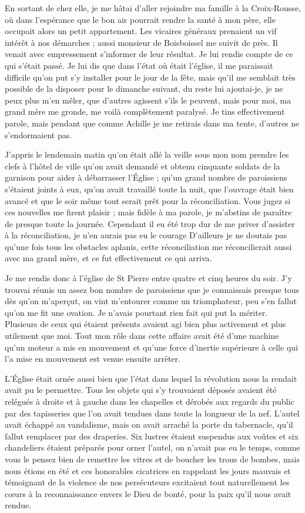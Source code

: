 \documentclass[11pt,a4paper]{report}
\begin{document}
En sortant de chez elle, je me hâtai d'aller rejoindre ma famille à la Croix-Rousse, où dans l'espérance que le bon air pourrait rendre la santé à mon père, elle occupait alors un petit appartement. Les vicaires généraux prenaient un vif intérêt à nos démarches ; aussi monsieur de Boisboissel me suivit de près. Il venait avec empressement s'informer de leur résultat. Je lui rendis compte de ce qui s'était passé. Je lui dis que dans l'état où était l'église, il me paraissait difficile qu'on put s'y installer pour le jour de la fête, mais qu'il me semblait très possible de la disposer pour le dimanche suivant, du reste lui ajoutai-je, je ne peux plus m'en mêler, que d'autres agissent s'ils le peuvent, mais pour moi, ma grand mère me gronde, me voilà complètement paralysé. Je tins effectivement parole, mais pendant que comme Achille je me retirais dans ma tente, d'autres ne s'endormaient pas.

J'appris le lendemain matin qu'on était allé la veille sous mon nom prendre les clefs à l'hôtel de ville qu'on avait demandé et obtenu cinquante soldats de la garnison pour aider à débarrasser l'Église ; qu'un grand nombre de paroissiens s'étaient joints à eux, qu'on avait travaillé toute la nuit, que l'ouvrage était bien avancé et que le soir même tout serait prêt pour la réconciliation. Vous jugez si ces nouvelles me firent plaisir ; mais fidèle à ma parole, je m'abstins de paraître de presque toute la journée. Cependant il eu été trop dur de me priver d'assister à la réconciliation, je n'en aurais pas eu le courage D'ailleurs je ne doutais pas qu'une fois tous les obstacles aplanis, cette réconciliation me réconcilierait aussi avec ma grand mère, et ce fut effectivement ce qui arriva.

Je me rendis donc à l'église de St Pierre entre quatre et cinq heures du soir. J'y trouvai réunis un assez bon nombre de paroissiens que je connaissais presque tous dès qu'on m'aperçut, on vint m'entourer comme un triomphateur, peu s'en fallut qu'on me fit une ovation. Je n'avais pourtant rien fait qui put la mériter. Plusieurs de ceux qui étaient présents avaient agi bien plus activement et plus utilement que moi. Tout mon rôle dans cette affaire avait été d'une machine qu'un moteur a mis en mouvement et qu'une force d'inertie supérieure à celle qui l'a mise en mouvement est venue ensuite arrêter.

L'Église était ornée aussi bien que l'état dans lequel la révolution nous la rendait avait pu le permettre. Tous les objets qui s'y trouvaient déposés avaient été relégués à droite et à gauche dans les chapelles et dérobés aux regards du public par des tapisseries que l'on avait tendues dans toute la longueur de la nef. L'autel avait échappé au vandalisme, mais on avait arraché la porte du tabernacle, qu'il fallut remplacer par des draperies. Six lustres étaient suspendus aux voûtes et six chandeliers étaient préparés pour orner l'autel, on n'avait pas eu le temps, comme vous le pensez bien de remettre les vitres et de boucher les trous de bombes, mais nous étions en été et ces honorables cicatrices en rappelant les jours mauvais et témoignant de la violence de nos persécuteurs excitaient tout naturellement les cœurs à la reconnaissance envers le Dieu de bonté, pour la paix qu'il nous avait rendue.
\end{document}
